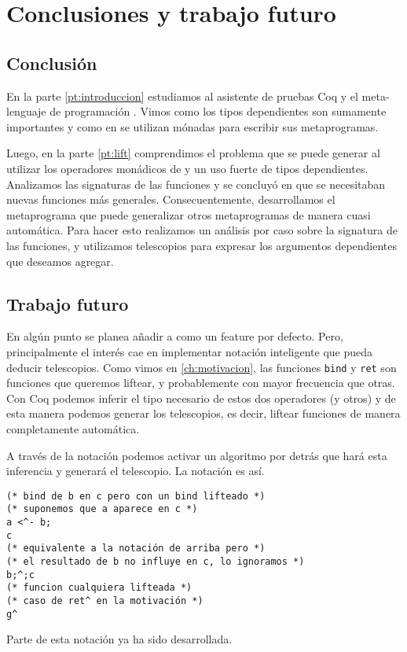 \chapter{Conclusiones y trabajo futuro}\label{ch:conclusion}

\section{Conclusión}\label{sc:conclusion}

En la parte \ref{pt:introduccion} estudiamos al asistente de pruebas Coq y el meta-lenguaje de programación \mtac. Vimos como los tipos dependientes son sumamente importantes y como en \mtac se utilizan mónadas para escribir sus metaprogramas.

Luego, en la parte \ref{pt:lift} comprendimos el problema que se puede generar al utilizar los operadores monádicos de \mtac y un uso fuerte de tipos dependientes. Analizamos las signaturas de las funciones y se concluyó en que se necesitaban nuevas funciones más generales.
Consecuentemente, desarrollamos el metaprograma \lift que puede generalizar otros metaprogramas de manera cuasi automática. Para hacer esto realizamos un análisis por caso sobre la signatura de las funciones, y utilizamos telescopios para expresar los argumentos dependientes que deseamos agregar.

\section{Trabajo futuro}\label{sc:futuro}

En algún punto se planea añadir \lift a \mtac como un feature por defecto.
Pero, principalmente el interés cae en implementar notación inteligente que pueda deducir telescopios.
Como vimos en \ref{ch:motivacion}, las funciones \lstinline{bind} y \lstinline{ret} son funciones que queremos liftear, y probablemente con mayor frecuencia que otras.
Con Coq podemos inferir el tipo necesario de estos dos operadores (y otros) y de esta manera podemos generar los telescopios, es decir, liftear funciones de manera completamente automática.

A través de la notación podemos activar un algoritmo por detrás que hará esta inferencia y generará el telescopio.
La notación es así.

\begin{lstlisting}
(* bind de b en c pero con un bind lifteado *)
(* suponemos que a aparece en c *)
a <^- b;
c 
(* equivalente a la notación de arriba pero *)
(* el resultado de b no influye en c, lo ignoramos *)
b;^;c
(* funcion cualquiera lifteada *)
(* caso de ret^ en la motivación *)
g^ 
\end{lstlisting}

Parte de esta notación ya ha sido desarrollada.